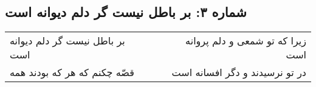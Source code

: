 \begin{center}
\section*{شماره ۳: بر باطل نیست گر دلم دیوانه است}
\label{sec:003}
\begin{longtable}{l p{0.5cm} r}
بر باطل نیست گر دلم دیوانه است
&&
زیرا که تو شمعی و دلم پروانه است
\\
قصّه چکنم که هر که بودند همه
&&
در تو نرسیدند و دگر افسانه است
\\
\end{longtable}
\end{center}
